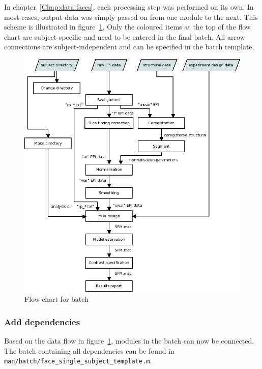 In chapter~\ref{Chap:data:faces}, each processing step was performed on its own. In
most cases, output data was simply passed on from one module to the next. This
scheme is illustrated in figure~\ref{fig:flow}. Only the coloured items at the
top of the flow chart are subject specific and need to be entered in the final
batch. All arrow connections are subject-independent and can be specified in
the batch template.

\begin{figure}
  \centering
  \includegraphics[width=.9\linewidth]{batch/flow}
  \caption{Flow chart for batch}
  \label{fig:flow}
\end{figure}

\subsubsection{Add dependencies}

Based on the data flow in figure~\ref{fig:flow}, modules in the batch can now
be connected. The batch containing all dependencies can be found in
\verb|man/batch/face_single_subject_template.m|.


